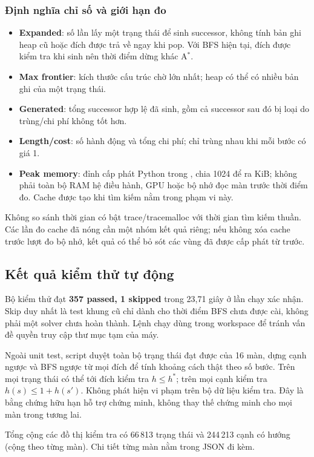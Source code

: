 \documentclass[a4paper]{article}
\newcommand{\tep}[1]{{\small\ttfamily\detokenize{#1}}}
\newcommand{\astar}{\texorpdfstring{A\ensuremath{^*}}{A*}}
\begin{document}
\subsubsection{Định nghĩa chỉ số và giới hạn đo}
\begin{itemize}
\item \textbf{Expanded}: số lần lấy một trạng thái để sinh successor, không tính bản ghi heap cũ hoặc đích được trả về ngay khi pop. Với BFS hiện tại, đích được kiểm tra khi sinh nên thời điểm dừng khác \astar{}.
\item \textbf{Max frontier}: kích thước cấu trúc chờ lớn nhất; heap có thể có nhiều bản ghi của một trạng thái.
\item \textbf{Generated}: tổng successor hợp lệ đã sinh, gồm cả successor sau đó bị loại do trùng/chi phí không tốt hơn.
\item \textbf{Length/cost}: số hành động và tổng chi phí; chỉ trùng nhau khi mỗi bước có giá 1.
\item \textbf{Peak memory}: đỉnh cấp phát Python trong \tep{solver.run()}, chia 1024 để ra KiB; không phải toàn bộ RAM hệ điều hành, GPU hoặc bộ nhớ đọc màn trước thời điểm đo. Cache được tạo khi tìm kiếm nằm trong phạm vi này.
\end{itemize}

Không so sánh thời gian có bật trace/tracemalloc với thời gian tìm kiếm thuần. Các lần đo cache đã nóng cần một nhóm kết quả riêng; nếu không xóa cache trước lượt đo bộ nhớ, kết quả có thể bỏ sót các vùng đã được cấp phát từ trước.


\subsection{Kết quả kiểm thử tự động}
Bộ kiểm thử đạt \textbf{357 passed, 1 skipped} trong 23,71 giây ở lần chạy xác nhận. Skip duy nhất là test khung cũ chỉ dành cho thời điểm BFS chưa được cài, không phải một solver chưa hoàn thành. Lệnh chạy dùng \tep{--basetemp} trong workspace để tránh vấn đề quyền truy cập thư mục tạm của máy.

Ngoài unit test, script duyệt toàn bộ trạng thái đạt được của 16 màn, dựng cạnh ngược và BFS ngược từ mọi đích để tính khoảng cách thật theo số bước. Trên mọi trạng thái có thể tới đích kiểm tra $h\le h^*$; trên mọi cạnh kiểm tra $h(s)\le1+h(s')$. Không phát hiện vi phạm trên bộ dữ liệu kiểm tra. Đây là bằng chứng hữu hạn hỗ trợ chứng minh, không thay thế chứng minh cho mọi màn trong tương lai.

Tổng cộng các đồ thị kiểm tra có 66\,813 trạng thái và 244\,213 cạnh có hướng (cộng theo từng màn). Chi tiết từng màn nằm trong JSON đi kèm.
\end{document}
